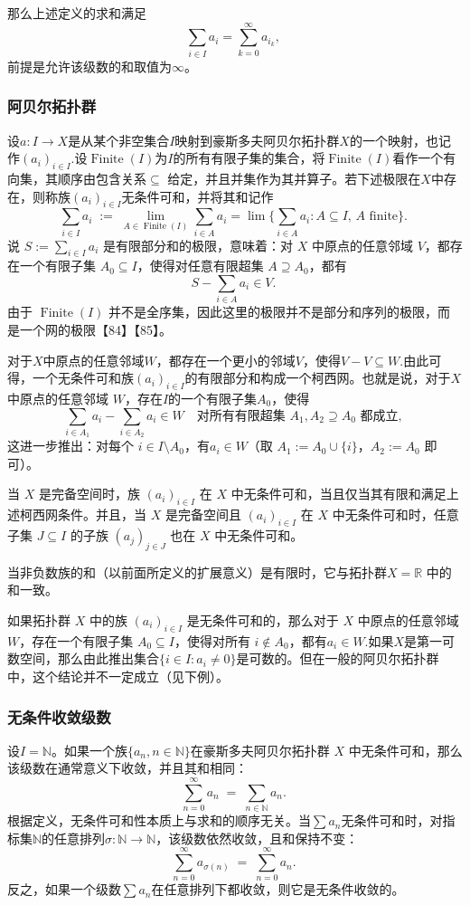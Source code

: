 那么上述定义的求和满足
$$
\sum_{i \in I} a_{i} = \sum_{k=0}^{\infty} a_{i_{k}},~
$$
前提是允许该级数的和取值为$\infty$。

\subsubsection{阿贝尔拓扑群}
设$a: I \to X$是从某个非空集合$I$映射到豪斯多夫阿贝尔拓扑群$X$的一个映射，也记作$(a_{i})_{i \in I}$.设$\operatorname{Finite}(I)$为$I$的所有有限子集的集合，将$\operatorname{Finite}(I)$看作一个有向集，其顺序由包含关系$\subseteq$ 给定，并且并集作为其并算子。若下述极限在$X$中存在，则称族$(a_{i})_{i \in I}$无条件可和，并将其和记作
$$
\sum_{i \in I} a_{i} \;:=\; \lim_{A \in \operatorname{Finite}(I)} \sum_{i \in A} a_{i} 
= \lim \Biggl\{ \sum_{i \in A} a_{i} : A \subseteq I, \, A \text{ finite} \Biggr\}.~
$$
说 $S := \sum_{i \in I} a_{i}$
是有限部分和的极限，意味着：对 $X$ 中原点的任意邻域 $V$，都存在一个有限子集 $A_{0} \subseteq I$，使得对任意有限超集 $A \supseteq A_{0}$，都有
$$
S - \sum_{i \in A} a_{i} \in V.~
$$
由于 $\operatorname{Finite}(I)$ 并不是全序集，因此这里的极限并不是部分和序列的极限，而是一个网的极限【84】【85】。

对于$X$中原点的任意邻域$W$，都存在一个更小的邻域$V$，使得$V - V \subseteq W$.由此可得，一个无条件可和族$(a_{i})_{i \in I}$的有限部分和构成一个柯西网。也就是说，对于$X$中原点的任意邻域 $W$，存在$I$的一个有限子集$A_{0}$，使得
$$
\sum_{i \in A_{1}} a_{i} - \sum_{i \in A_{2}} a_{i} \in W \quad \text{对所有有限超集 } A_{1}, A_{2} \supseteq A_{0} \text{ 都成立},~
$$
这进一步推出：对每个 $i \in I \setminus A_{0}$，有$a_{i} \in W$（取 $A_{1} := A_{0} \cup \{i\}$，$A_{2} := A_{0}$ 即可）。

当 $X$ 是完备空间时，族 $(a_{i})_{i \in I}$ 在 $X$ 中无条件可和，当且仅当其有限和满足上述柯西网条件。并且，当 $X$ 是完备空间且 $(a_{i})_{i \in I}$ 在 $X$ 中无条件可和时，任意子集 $J \subseteq I$ 的子族 $(a_{j})_{j \in J}$ 也在 $X$ 中无条件可和。

当非负数族的和（以前面所定义的扩展意义）是有限时，它与拓扑群$X = \mathbb{R}$ 中的和一致。

如果拓扑群 $X$ 中的族 $(a_{i})_{i \in I}$ 是无条件可和的，那么对于 $X$ 中原点的任意邻域 $W$，存在一个有限子集 $A_{0} \subseteq I$，使得对所有 $i \notin A_{0}$，都有$a_{i} \in W$.如果$X$是第一可数空间，那么由此推出集合$\{i \in I : a_{i} \neq 0\}$是可数的。但在一般的阿贝尔拓扑群中，这个结论并不一定成立（见下例）。
\subsubsection{无条件收敛级数}
设$I = \mathbb{N}$。如果一个族$\{a_{n}, n \in \mathbb{N}\}$在豪斯多夫阿贝尔拓扑群 $X$ 中无条件可和，那么该级数在通常意义下收敛，并且其和相同：
$$
\sum_{n=0}^{\infty} a_{n} \;=\; \sum_{n \in \mathbb{N}} a_{n}.~
$$
根据定义，无条件可和性本质上与求和的顺序无关。当$\sum a_{n}$无条件可和时，对指标集$\mathbb{N}$的任意排列$\sigma : \mathbb{N} \to \mathbb{N}$，该级数依然收敛，且和保持不变：
$$
\sum_{n=0}^{\infty} a_{\sigma(n)} \;=\; \sum_{n=0}^{\infty} a_{n}.~
$$
反之，如果一个级数$\sum a_{n}$在任意排列下都收敛，则它是无条件收敛的。

